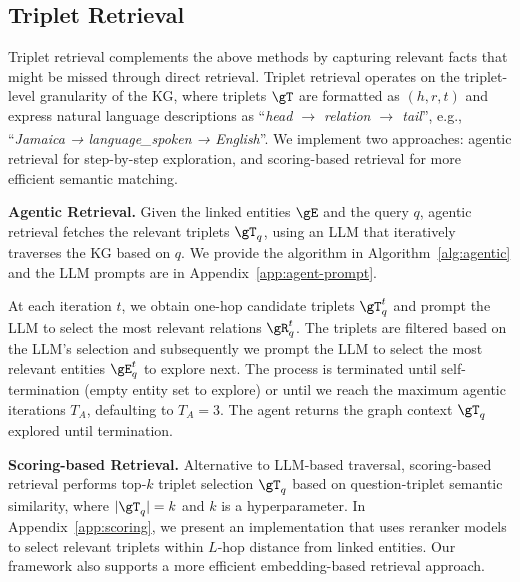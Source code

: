 \documentclass[11pt]{article}
\begin{document}
\subsection{Triplet  Retrieval}
\label{sec:agentic}
Triplet retrieval complements the above methods by capturing relevant facts that might be missed through direct retrieval. Triplet retrieval operates on the triplet-level granularity of the KG, where triplets $\gT$ are formatted as $(h,r,t)$ and express natural language descriptions as ``\textit{head $\xrightarrow[]{}$ relation $\xrightarrow[]{}$ tail}'', e.g., ``\textit{Jamaica →
language\_spoken → English}''. We implement two approaches: agentic retrieval for step-by-step exploration, and scoring-based retrieval for more efficient semantic matching.







\textbf{Agentic Retrieval.}
Given the linked entities $\gE$ and the query $q$, agentic  retrieval  fetches the relevant triplets $\gT_q$, using an LLM that iteratively traverses the KG based on $q$. We provide the algorithm in Algorithm~\ref{alg:agentic} and the LLM prompts are in Appendix~\ref{app:agent-prompt}.


At each iteration $t$, we obtain one-hop candidate triplets $\gT_q^t$ and prompt the LLM to  select  the most relevant relations $\gR_q^t$. The triplets are filtered based on the LLM's selection and subsequently we prompt the LLM to select the most relevant entities  $\gE_q^t$ to explore next. The process is terminated until self-termination (empty entity set to explore) or until we reach the maximum agentic iterations $T_A$, defaulting to $T_A=3$. The agent returns the graph context $\gT_q$ explored until termination. 


\textbf{Scoring-based  Retrieval.}
Alternative to LLM-based traversal, scoring-based retrieval performs top-$k$ triplet selection $\gT_q$ based on question-triplet semantic similarity, where $|\gT_q| = k$ and $k$ is a hyperparameter. In Appendix~\ref{app:scoring}, we present an implementation that uses reranker models to select relevant triplets within $L$-hop distance from linked entities. Our framework  also supports a more efficient embedding-based retrieval approach.




 
\end{document}
